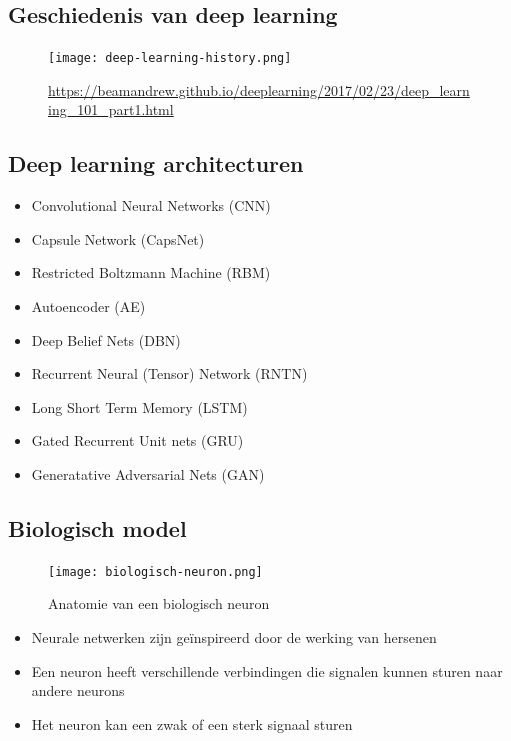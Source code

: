 \documentclass{article}
\begin{document}
\subsection{Geschiedenis van deep learning}

\begin{figure}[H]
    \centering
    \texttt{[image: deep-learning-history.png]}
    \caption{\url{https://beamandrew.github.io/deeplearning/2017/02/23/deep_learning_101_part1.html}}
\end{figure}


\subsection{Deep learning architecturen}

\begin{itemize}
    \item Convolutional Neural Networks (CNN)
    \item Capsule Network (CapsNet)
    \item Restricted Boltzmann Machine (RBM)
    \item Autoencoder (AE)
    \item Deep Belief Nets (DBN)
    \item Recurrent Neural (Tensor) Network (RNTN)
    \item Long Short Term Memory (LSTM)
    \item Gated Recurrent Unit nets (GRU)
    \item Generatative Adversarial Nets (GAN)
\end{itemize}

\subsection{Biologisch model}

\begin{figure}[H]
    \centering
    \texttt{[image: biologisch-neuron.png]}
    \caption{Anatomie van een biologisch neuron}
\end{figure}

\begin{itemize}
    \item Neurale netwerken zijn geïnspireerd door de werking van hersenen
    \item Een neuron heeft verschillende verbindingen die signalen kunnen sturen naar andere neurons
    \item Het neuron kan een zwak of een sterk signaal sturen
\end{itemize}
\end{document}
